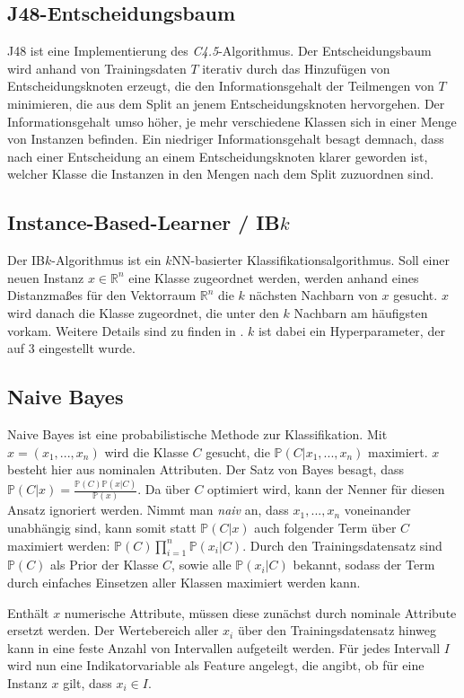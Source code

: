 \subsection{J48-Entscheidungsbaum}
J48 ist eine Implementierung des \textit{C4.5}-Algorithmus\cite{Quinlan1993}. Der Entscheidungsbaum wird anhand von Trainingsdaten $T$ iterativ durch das Hinzufügen von Entscheidungsknoten erzeugt, die den Informationsgehalt der Teilmengen von $T$ minimieren, die aus dem Split an jenem Entscheidungsknoten hervorgehen. Der Informationsgehalt umso höher, je mehr verschiedene Klassen sich in einer Menge von Instanzen befinden. Ein niedriger Informationsgehalt besagt demnach, dass nach einer Entscheidung an einem Entscheidungsknoten klarer geworden ist, welcher Klasse die Instanzen in den Mengen nach dem Split zuzuordnen sind.
\subsection{Instance-Based-Learner / IB$k$}
Der IB$k$-Algorithmus ist ein $k$NN-basierter Klassifikationsalgorithmus. Soll einer neuen Instanz $x \in \mathbb{R}^n$ eine Klasse zugeordnet werden, werden anhand eines Distanzmaßes für den Vektorraum $\mathbb{R}^n$ die $k$ nächsten Nachbarn von $x$ gesucht. $x$ wird danach die Klasse zugeordnet, die unter den $k$ Nachbarn am häufigsten vorkam. Weitere Details sind zu finden in \cite{Aha1991}.
$k$ ist dabei ein Hyperparameter, der auf 3 eingestellt wurde.
\subsection{Naive Bayes}
Naive Bayes ist eine probabilistische Methode zur Klassifikation\cite{John1995}. Mit $x = (x_1, ..., x_n)$ wird die Klasse $C$ gesucht, die $\mathbb{P}(C | x_1, ..., x_n)$ maximiert. $x$ besteht hier aus nominalen Attributen. Der Satz von Bayes besagt, dass $\mathbb{P}(C|x) = \frac{\mathbb{P}(C) \mathbb{P}(x | C)}{\mathbb{P}(x)}$. Da über $C$ optimiert wird, kann der Nenner für diesen Ansatz ignoriert werden. Nimmt man \textit{naiv} an, dass $x_1, ..., x_n$ voneinander unabhängig sind, kann somit statt $\mathbb{P}(C | x)$ auch folgender Term über $C$ maximiert werden: $\mathbb{P}(C) \prod_{i=1}^{n} \mathbb{P}(x_i | C)$. Durch den Trainingsdatensatz sind $\mathbb{P}(C)$ als Prior der Klasse $C$, sowie alle $\mathbb{P}(x_i | C)$ bekannt, sodass der Term durch einfaches Einsetzen aller Klassen maximiert werden kann.

Enthält $x$ numerische Attribute, müssen diese zunächst durch nominale Attribute ersetzt werden. Der Wertebereich aller $x_i$ über den Trainingsdatensatz hinweg kann in eine feste Anzahl von Intervallen aufgeteilt werden. Für jedes Intervall $I$ wird nun eine Indikatorvariable als Feature angelegt, die angibt, ob für eine Instanz $x$ gilt, dass $x_i \in I$.
